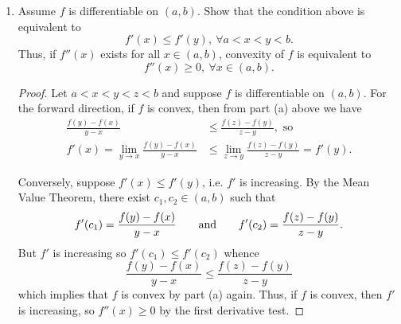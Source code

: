 \documentclass[11pt,oneside,english]{amsart}
\theoremstyle{definition}
\newcommand{\aspace}{\hspace{7mm}\text{and}\hspace{7mm}}
\newcommand{\lom}[2]{\lim_{{#1}\rightarrow{#2}}}
\begin{document}
\begin{enumerate}
\begin{enumerate}
\begin{proof}
Let $a<x<y<z<b$. Then we can write $y=tx+(1-t)z$ for some $t\in(0,1)$. Thus,
\begin{align*}
\frac{f(y)-f(x)}{y-x}&\leq\frac{f(z)-f(y)}{z-y}\\[2mm]
\frac{f(tx+(1-t)z)-f(x)}{tx+(1-t)z-x}&\leq\frac{f(z)-f(tx+(1-t)z)}{z-[tx+(1-t)z]}\\[2mm]
\frac{f(tx+(1-t)z)-f(x)}{(1-t)\cancel{(z-x)}}&\leq\frac{f(z)-f(tx+(1-t)z)}{t\cancel{(z-x)}}\\[2mm]
tf(tx+(1-t)z)-tf(x)&\leq(1-t)f(z)-(1-t)f(tx+(1-t)z)\\[2mm]
\cancel{tf(tx+(1-t)z)}-tf(x)&\leq f(z)-tf(z)-f(tx+(1-t)z)+\cancel{tf(tx+(1-t)z)}\\[2mm]
f(tx+(1-t)z)&\leq tf(x)+f(z)-tf(z)\\[2mm]
f(tx+(1-t)z)&\leq tf(x)+(1-t)f(z).
\end{align*}

Since $x,y,z\in(a,b)$ are arbitrary, the inequality above holds if and only if $f$ is convex for all $a<x<y<z<b$.
\end{proof}

\item Assume $f$ is differentiable on $(a,b)$. Show that the condition above is equivalent to 
\[
f'(x)\le f'(y),\ \forall a<x<y<b.
\] 
Thus, if $f''(x)$ exists for all $x\in(a,b)$, convexity of $f$ is equivalent to
\[
f''(x)\ge 0,\ \forall x\in (a, b).
\]

\begin{proof}
Let $a<x<y<z<b$ and suppose $f$ is differentiable on $(a,b)$. For the forward direction, if $f$ is convex, then from part (a) above we have
\begin{align*}
\frac{f(y)-f(x)}{y-x}&\leq\frac{f(z)-f(y)}{z-y},\text{ so}\\[2mm]
f'(x)=\lom{y}{x}\frac{f(y)-f(x)}{y-x}&\leq\lom{z}{y}\frac{f(z)-f(y)}{z-y}=f'(y).
\end{align*}

Conversely, suppose $f'(x)\leq f'(y)$, i.e. $f'$ is increasing. By the Mean Value Theorem, there exist $c_1,c_2\in(a,b)$ such that
\[
f'(c_1)=\frac{f(y)-f(x)}{y-x}\aspace f'(c_2)=\frac{f(z)-f(y)}{z-y}.
\]
But $f'$ is increasing so $f'(c_1)\leq f'(c_2)$ whence
\[
\frac{f(y)-f(x)}{y-x}\leq \frac{f(z)-f(y)}{z-y}
\]
which implies that $f$ is convex by part (a) again. Thus, if $f$ is convex, then $f'$ is increasing, so $f''(x)\geq 0$ by the first derivative test.
\end{proof}


\end{enumerate}
\end{enumerate}
\end{document}

